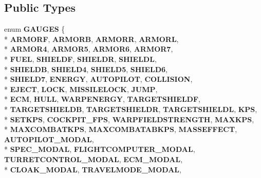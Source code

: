 \subsection*{Public Types}
\begin{DoxyCompactItemize}
\item 
enum {\bfseries G\+A\+U\+G\+ES} \{ \\*
{\bfseries A\+R\+M\+O\+RF}, 
{\bfseries A\+R\+M\+O\+RB}, 
{\bfseries A\+R\+M\+O\+RR}, 
{\bfseries A\+R\+M\+O\+RL}, 
\\*
{\bfseries A\+R\+M\+O\+R4}, 
{\bfseries A\+R\+M\+O\+R5}, 
{\bfseries A\+R\+M\+O\+R6}, 
{\bfseries A\+R\+M\+O\+R7}, 
\\*
{\bfseries F\+U\+EL}, 
{\bfseries S\+H\+I\+E\+L\+DF}, 
{\bfseries S\+H\+I\+E\+L\+DR}, 
{\bfseries S\+H\+I\+E\+L\+DL}, 
\\*
{\bfseries S\+H\+I\+E\+L\+DB}, 
{\bfseries S\+H\+I\+E\+L\+D4}, 
{\bfseries S\+H\+I\+E\+L\+D5}, 
{\bfseries S\+H\+I\+E\+L\+D6}, 
\\*
{\bfseries S\+H\+I\+E\+L\+D7}, 
{\bfseries E\+N\+E\+R\+GY}, 
{\bfseries A\+U\+T\+O\+P\+I\+L\+OT}, 
{\bfseries C\+O\+L\+L\+I\+S\+I\+ON}, 
\\*
{\bfseries E\+J\+E\+CT}, 
{\bfseries L\+O\+CK}, 
{\bfseries M\+I\+S\+S\+I\+L\+E\+L\+O\+CK}, 
{\bfseries J\+U\+MP}, 
\\*
{\bfseries E\+CM}, 
{\bfseries H\+U\+LL}, 
{\bfseries W\+A\+R\+P\+E\+N\+E\+R\+GY}, 
{\bfseries T\+A\+R\+G\+E\+T\+S\+H\+I\+E\+L\+DF}, 
\\*
{\bfseries T\+A\+R\+G\+E\+T\+S\+H\+I\+E\+L\+DB}, 
{\bfseries T\+A\+R\+G\+E\+T\+S\+H\+I\+E\+L\+DR}, 
{\bfseries T\+A\+R\+G\+E\+T\+S\+H\+I\+E\+L\+DL}, 
{\bfseries K\+PS}, 
\\*
{\bfseries S\+E\+T\+K\+PS}, 
{\bfseries C\+O\+C\+K\+P\+I\+T\+\_\+\+F\+PS}, 
{\bfseries W\+A\+R\+P\+F\+I\+E\+L\+D\+S\+T\+R\+E\+N\+G\+TH}, 
{\bfseries M\+A\+X\+K\+PS}, 
\\*
{\bfseries M\+A\+X\+C\+O\+M\+B\+A\+T\+K\+PS}, 
{\bfseries M\+A\+X\+C\+O\+M\+B\+A\+T\+A\+B\+K\+PS}, 
{\bfseries M\+A\+S\+S\+E\+F\+F\+E\+CT}, 
{\bfseries A\+U\+T\+O\+P\+I\+L\+O\+T\+\_\+\+M\+O\+D\+AL}, 
\\*
{\bfseries S\+P\+E\+C\+\_\+\+M\+O\+D\+AL}, 
{\bfseries F\+L\+I\+G\+H\+T\+C\+O\+M\+P\+U\+T\+E\+R\+\_\+\+M\+O\+D\+AL}, 
{\bfseries T\+U\+R\+R\+E\+T\+C\+O\+N\+T\+R\+O\+L\+\_\+\+M\+O\+D\+AL}, 
{\bfseries E\+C\+M\+\_\+\+M\+O\+D\+AL}, 
\\*
{\bfseries C\+L\+O\+A\+K\+\_\+\+M\+O\+D\+AL}, 
{\bfseries T\+R\+A\+V\+E\+L\+M\+O\+D\+E\+\_\+\+M\+O\+D\+AL}, 

\end{DoxyCompactItemize}
